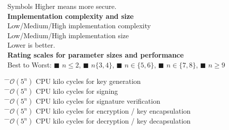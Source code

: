 \documentclass[11pt,english,a4paper, landscape]{scrartcl}
\begin{document}
\begin{minipage}[t]{0.4\textwidth}
\begin{algorithmbox}{Symbols}
			Higher means more secure.\\[\baselineskip]

			{\bfseries Implementation complexity and size}\\[0.5\baselineskip]
			 Low/Medium/High implementation complexity\\
			 Low/Medium/High implementation size\\[\baselineskip]
			Lower is better.\\[\baselineskip]

			{\bfseries Rating scales for parameter sizes and performance}\\[0.5\baselineskip]
			Best to Worst: \textcolor{themegreen}{$\blacksquare$} $n\leq2$, \textcolor{themeyellow}{$\blacksquare$} $n\{3,4\}$, \textcolor{themeorange}{$\blacksquare$} $n\in\{5,6\}$, \textcolor{themered}{$\blacksquare$} $n\in\{7,8\}$, \textcolor{themered!65!black}{$\blacksquare$} $n\geq9$
			\begin{tabbing}
				\=
				\=$\mathcal{O}(5^n)$ CPU kilo cycles for key generation\\

				\=
				\=$\mathcal{O}(5^n)$ CPU kilo cycles for signing\\

				\=
				\=$\mathcal{O}(5^n)$ CPU kilo cycles for signature verification\\

				\=
				\=$\mathcal{O}(5^n)$ CPU kilo cycles for encryption / key encapsulation\\

				\=
				\=$\mathcal{O}(5^n)$ CPU kilo cycles for decryption / key decapsulation\\


\end{tabbing}
\end{algorithmbox}
\end{minipage}
\end{document}
